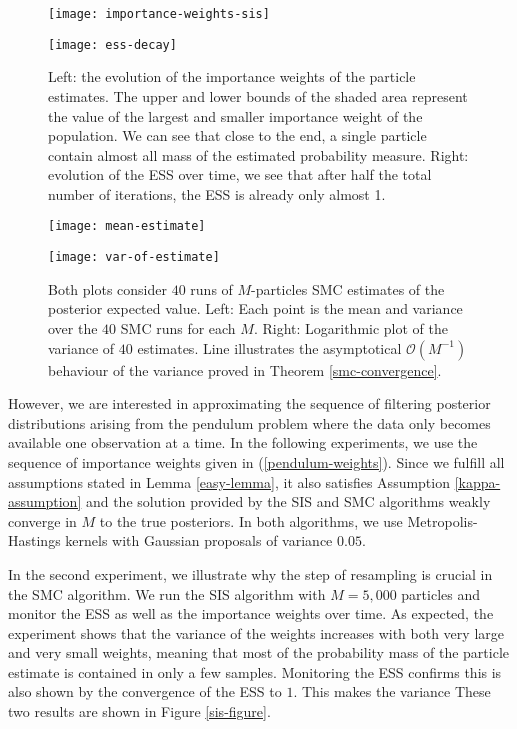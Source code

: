 \begin{figure}[htbp]
  \begin{minipage}{.5\textwidth}
    \texttt{[image: importance-weights-sis]}
  \end{minipage}
  \begin{minipage}{.5\textwidth}
    \texttt{[image: ess-decay]}
  \end{minipage}
  \caption{Left: the evolution of the importance weights of the particle estimates. The upper and lower bounds of the shaded area represent the value of the largest and smaller importance weight of the population. We can see that close to the end, a single particle contain almost all mass of the estimated probability measure. Right: evolution of the ESS over time, we see that after half the total number of iterations, the ESS is already only almost 1.}\label{sis-figure}

  \bigskip
  
  \begin{minipage}{.5\textwidth}
    \texttt{[image: mean-estimate]}
  \end{minipage}
  \begin{minipage}{.5\textwidth}
    \texttt{[image: var-of-estimate]}
  \end{minipage}
  \caption{Both plots consider $40$ runs of $M$-particles SMC estimates of the posterior expected value. Left: Each point is the mean and variance over the $40$ SMC runs for each $M$. Right: Logarithmic plot of the variance of $40$ estimates. Line illustrates the asymptotical $\mathcal{O}(M^{-1})$ behaviour of the variance proved in Theorem \ref{smc-convergence}. }\label{smc-figure}
\end{figure}


However, we are interested in approximating the sequence of filtering posterior distributions arising from the pendulum problem where the data only becomes available one observation at a time. In the following experiments, we use the sequence of importance weights given in (\ref{pendulum-weights}). Since we fulfill all assumptions stated in Lemma \ref{easy-lemma}, it also satisfies Assumption \ref{kappa-assumption} and the solution provided by the SIS and SMC algorithms weakly converge in $M$ to the true posteriors. In both algorithms, we use Metropolis-Hastings kernels with Gaussian proposals of variance $0.05$. 

In the second experiment, we illustrate why the step of resampling is crucial in the SMC algorithm. We run the SIS algorithm with $M=5,000$ particles and monitor the ESS as well as the importance weights over time. As expected, the experiment shows that the variance of the weights increases with both very large and very small weights, meaning that most of the probability mass of the particle estimate is contained in only a few samples. Monitoring the ESS confirms this is also shown by the convergence of the ESS to $1$. This makes the variance These two results are shown in Figure \ref{sis-figure}.

